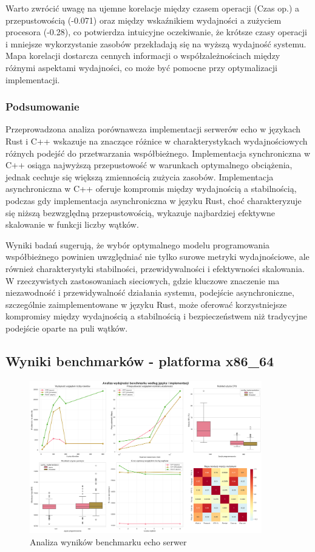 Warto zwrócić uwagę na ujemne korelacje między czasem operacji (Czas op.) a przepustowością (-0.071) oraz między wskaźnikiem wydajności a zużyciem procesora (-0.28), co potwierdza intuicyjne oczekiwanie, że krótsze czasy operacji i mniejsze wykorzystanie zasobów przekładają się na wyższą wydajność systemu. Mapa korelacji dostarcza cennych informacji o współzależnościach między różnymi aspektami wydajności, co może być pomocne przy optymalizacji implementacji.

\subsubsection{Podsumowanie}
Przeprowadzona analiza porównawcza implementacji serwerów echo w językach Rust i C++ wskazuje na znaczące różnice w charakterystykach wydajnościowych różnych podejść do przetwarzania współbieżnego. Implementacja synchroniczna w C++ osiąga najwyższą przepustowość w warunkach optymalnego obciążenia, jednak cechuje się większą zmiennością zużycia zasobów. Implementacja asynchroniczna w C++ oferuje kompromis między wydajnością a stabilnością, podczas gdy implementacja asynchroniczna w języku Rust, choć charakteryzuje się niższą bezwzględną przepustowością, wykazuje najbardziej efektywne skalowanie w funkcji liczby wątków.

Wyniki badań sugerują, że wybór optymalnego modelu programowania współbieżnego powinien uwzględniać nie tylko surowe metryki wydajnościowe, ale również charakterystyki stabilności, przewidywalności i efektywności skalowania. W rzeczywistych zastosowaniach sieciowych, gdzie kluczowe znaczenie ma niezawodność i przewidywalność działania systemu, podejście asynchroniczne, szczególnie zaimplementowane w języku Rust, może oferować korzystniejsze kompromisy między wydajnością a stabilnością i bezpieczeństwem niż tradycyjne podejście oparte na puli wątków.

\subsection{Wyniki benchmarków - platforma x86\_64}
\begin{figure}[H]
    \centering
    \includegraphics[width=0.9\textwidth]{analiza/images/conc/echo/x86/analiza_benchmarku.png}
    \caption{Analiza wyników benchmarku echo serwer}
    \label{analiza_benchmarku_echo_serwer_x86_64}
\end{figure}


